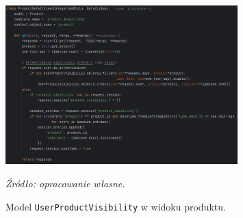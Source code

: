 \documentclass[12pt,a4paper,oneside]{article}
\theoremstyle{definition}
\numberwithin{equation}{section}
\begin{document}
\begin{figure}[H]
    \centering
    \includegraphics[width=0.8\textwidth]{images/krzysztofBImages/product_visibility_usage.png}
    \caption{Model \texttt{UserProductVisibility} w widoku produktu.}
    \emph{Źródło: opracowanie własne.}
    \label{fig:user_product_visibility}
\end{figure}
%
%
\end{document}
